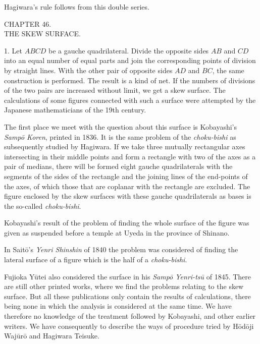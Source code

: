 \documentclass[11pt]{article}
\newcommand{\scanpage}[2]{\clearpage\setcounter{footnote}{0}\noindent{\footnotesize\color{gray}PDF page #1 · #2}\par\medskip}
\begin{document}
Hagiwara's rule follows from this double series.

\scanpage{0329}{printed page 315 (top right)}
\begin{center}
CHAPTER 46.\\[1mm]
THE SKEW SURFACE.
\end{center}

1. Let $ABCD$ be a gauche quadrilateral. Divide the opposite sides $AB$ and $CD$ into an equal number of equal parts and join the corresponding points of division by straight lines. With the other pair of opposite sides $AD$ and $BC$, the same construction is performed. The result is a kind of net. If the numbers of divisions of the two pairs are increased without limit, we get a skew surface. The calculations of some figures connected with such a surface were attempted by the Japanese mathematicians of the 19th century.

The first place we meet with the question about this surface is Kobayashi's \emph{Sampō Koren}, printed in 1836. It is the same problem of the \emph{choku-bishi} as subsequently studied by Hagiwara. If we take three mutually rectangular axes intersecting in their middle points and form a rectangle with two of the axes as a pair of medians, there will be formed eight gauche quadrilaterals with the segments of the sides of the rectangle and the joining lines of the end-points of the axes, of which those that are coplanar with the rectangle are excluded. The figure enclosed by the skew surfaces with these gauche quadrilaterals as bases is the so-called \emph{choku-bishi}.

Kobayashi's result of the problem of finding the whole surface of the figure was given as suspended before a temple at Uyeda in the province of Shinano.

In Saitō's \emph{Yenri Shinshin} of 1840 the problem was considered of finding the lateral surface of a figure which is the half of a \emph{choku-bishi}.

Fujioka Yūtei also considered the surface in his \emph{Sampō Yenri-tsū} of 1845. There are still other printed works, where we find the problems relating to the skew surface. But all these publications only contain the results of calculations, there being none in which the analysis is considered at the same time. We have therefore no knowledge of the treatment followed by Kobayashi, and other earlier writers. We have consequently to describe the ways of procedure tried by Hōdōji Wajūrō and Hagiwara Teisuke.
\end{document}
